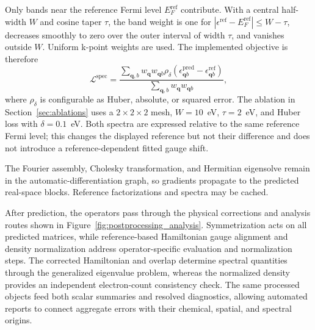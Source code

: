 \documentclass[preprint,12pt,compress,numafflabel]{elsarticle}
\newcommand{\Loss}{\mathcal{L}}
\begin{document}
Only bands near the reference Fermi level $E_F^{\mathrm{ref}}$ contribute. With a central half-width $W$ and cosine taper $\tau$, the band weight is one for
$|\epsilon^{\mathrm{ref}}-E_F^{\mathrm{ref}}|\le W-\tau$, decreases smoothly to zero over the outer interval of width $\tau$, and vanishes outside $W$. Uniform k-point weights are used. The implemented objective is therefore
\begin{equation}
\Loss^{\mathrm{spec}}
=
\frac{\sum_{\bm{q},b}w_{\bm{q}}w_{\bm{q}b}
\rho_\delta\!\left(
\epsilon^{\mathrm{pred}}_{\bm{q}b}
-\epsilon^{\mathrm{ref}}_{\bm{q}b}
\right)}
{\sum_{\bm{q},b}w_{\bm{q}}w_{\bm{q}b}},
\end{equation}
where $\rho_\delta$ is configurable as Huber, absolute, or squared error. The ablation in Section~\ref{sec:ablations} uses a $2\times2\times2$ mesh, $W=10$~eV, $\tau=2$~eV, and Huber loss with $\delta=0.1$~eV. Both spectra are expressed relative to the same reference Fermi level; this changes the displayed reference but not their difference and does not introduce a reference-dependent fitted gauge shift.

The Fourier assembly, Cholesky transformation, and Hermitian eigensolve remain in the automatic-differentiation graph, so gradients propagate to the predicted real-space blocks. Reference factorizations and spectra may be cached.

After prediction, the operators pass through the physical corrections and analysis routes shown in Figure~\ref{fig:postprocessing_analysis}.
Symmetrization acts on all predicted matrices, while reference-based Hamiltonian gauge alignment and density normalization address operator-specific evaluation and normalization steps.
The corrected Hamiltonian and overlap determine spectral quantities through the generalized eigenvalue problem, whereas the normalized density provides an independent electron-count consistency check.
The same processed objects feed both scalar summaries and resolved diagnostics, allowing automated reports to connect aggregate errors with their chemical, spatial, and spectral origins.
\end{document}
